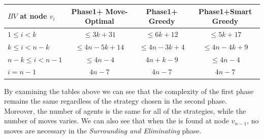 \begin{center}

\begin{tabular}{|l|c|c|c|}\hline
$BV$ at node $v_i$ &


Phase1+ Move-Optimal &
Phase1+ Greedy&
Phase1+Smart Greedy 
 \\ \hline\hline
$1\leq i<k$       & $\leq 3k+31$  & $\leq 6k+12$    &$\leq 5k+17$ \\\hline
$k\leq i<n-k$      & $\leq 4n-5k+14$        & $\leq 4n-3k+4$           & $\leq 4n-4k+9$     \\\hline
$n-k\leq i<n-1$    & $\leq 4n-4$        & $ 4n+k-9$            & $\leq 4n-4$               \\\hline
$ i=n-1$               & $4n-7$              & $4n-7$                        & $4n-7$          \\\hline
\end{tabular}
\end{center}



By examining the tables above we can see that the complexity of the first phase remains the same regardless of the strategy chosen  in the second phase.
Moreover, the number of agents is the same for all of the strategies, while the number of moves varies. We can also see that when the \bv is found at node $v_{n-1}$, no moves are necessary in the {\em Surrounding and Eliminating} phase. 
 



 

